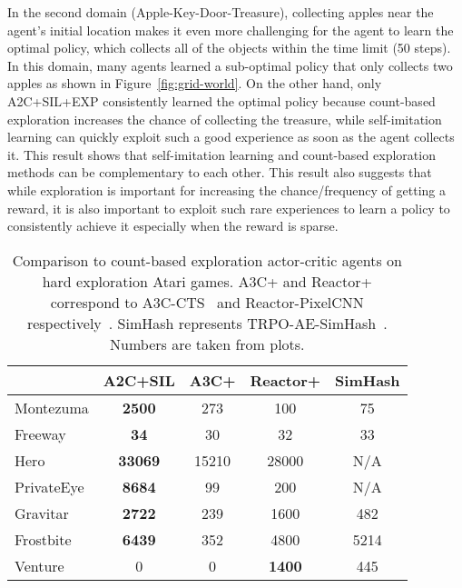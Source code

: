 \documentclass{article}
\newcommand{\cutsubsectionup}{\vspace*{-0.05in}}\newcommand{\cutsubsectiondown}{\vspace*{-0.05in}}
\begin{document}
In the second domain (Apple-Key-Door-Treasure), collecting apples near the agent's initial location makes it even more challenging for the agent to learn the optimal policy, which collects all of the objects within the time limit (50 steps). In this domain, many agents learned a sub-optimal policy that only collects two apples as shown in Figure~\ref{fig:grid-world}. On the other hand, only A2C+SIL+EXP consistently learned the optimal policy because count-based exploration increases the chance of collecting the treasure, while self-imitation learning can quickly exploit such a good experience as soon as the agent collects it. This result shows that self-imitation learning and count-based exploration methods can be complementary to each other. This result also suggests that while exploration is important for increasing the chance/frequency of getting a reward, it is also important to exploit such rare experiences to learn a policy to consistently achieve it especially when the reward is sparse.

\begin{table}
\caption{Comparison to count-based exploration actor-critic agents on hard exploration Atari games. A3C+ and Reactor+ correspond to A3C-CTS~\citep{bellemare2016unifying} and Reactor-PixelCNN respectively~\citep{ostrovski2017count}. SimHash represents TRPO-AE-SimHash~\citep{tang2017exploration}. Numbers are taken from plots. }
\label{tab:exp}
\begin{center}
\begin{small}
\begin{sc}
\setlength{\tabcolsep}{3pt}
\begin{tabular}{lcccc}
\toprule
 & \textbf{A2C+SIL} & A3C+ & Reactor+ & SimHash  \\
\midrule
Montezuma & \textbf{2500} & 273 & 100 & 75 \\
Freeway  & \textbf{34} & 30 & 32 & 33 \\
Hero  & \textbf{33069} & 15210 & 28000 & N/A \\
PrivateEye  & \textbf{8684} & 99 & 200 & N/A \\
Gravitar & \textbf{2722} & 239 & 1600 & 482 \\
Frostbite  & \textbf{6439} & 352 & 4800 & 5214 \\
Venture  & 0 & 0 & \textbf{1400} & 445 \\
\bottomrule
\end{tabular}
\end{sc}
\end{small}
\end{center}
\vskip -0.2in
\end{table}
\cutsubsectionup
\end{document}

